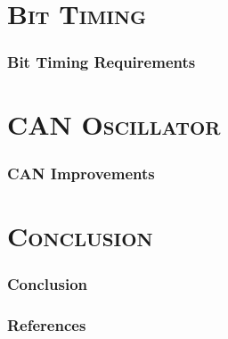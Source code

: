 \documentclass[xcolor=x11names,compress]{beamer}
\renewcommand{\(}{\begin{columns}}
\renewcommand{\)}{\end{columns}}
\newcommand{\<}[1]{\begin{column}{#1}}
\renewcommand{\>}{\end{column}}
\begin{document}
\section{\scshape Bit Timing}
\begin{frame}
  \frametitle{Bit Timing Requirements}

\end{frame}


\section{\scshape CAN Oscillator}
\begin{frame}
  \frametitle{CAN Improvements}
\end{frame}

\section{\scshape Conclusion}

\begin{frame}
  \frametitle{Conclusion}
\end{frame}

\begin{frame}
  \frametitle{References}
  \scriptsize
  
  
\end{frame}
\end{document}
